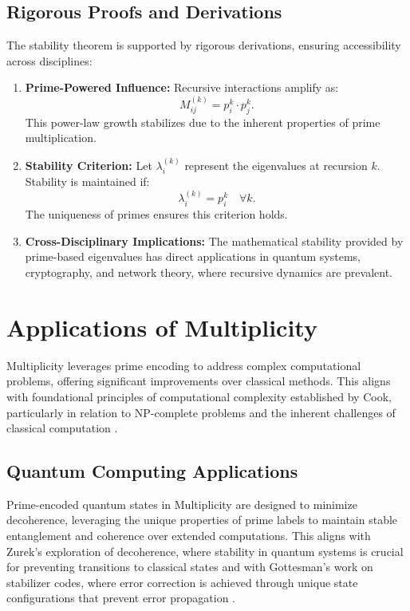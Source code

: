 \documentclass{article}
\theoremstyle{plain}
\begin{document}
\subsection{Rigorous Proofs and Derivations}
The stability theorem is supported by rigorous derivations, ensuring accessibility across disciplines:
\begin{enumerate}
    \item \textbf{Prime-Powered Influence:} Recursive interactions amplify as:
    \begin{equation}
    M_{ij}^{(k)} = p_i^{k} \cdot p_j^{k}.
    \end{equation}
    This power-law growth stabilizes due to the inherent properties of prime multiplication.
    
    \item \textbf{Stability Criterion:} Let $\lambda_i^{(k)}$ represent the eigenvalues at recursion $k$. Stability is maintained if:
    \begin{equation}
    \lambda_i^{(k)} = p_i^k \quad \forall k.
    \end{equation}
    The uniqueness of primes ensures this criterion holds.

    \item \textbf{Cross-Disciplinary Implications:} The mathematical stability provided by prime-based eigenvalues has direct applications in quantum systems, cryptography, and network theory, where recursive dynamics are prevalent.
\end{enumerate}
\section{Applications of Multiplicity}
Multiplicity leverages prime encoding to address complex computational problems, offering significant improvements over classical methods. This aligns with foundational principles of computational complexity established by Cook, particularly in relation to NP-complete problems and the inherent challenges of classical computation \cite{cook1971}.

\subsection{Quantum Computing Applications}

Prime-encoded quantum states in Multiplicity are designed to minimize decoherence, leveraging the unique properties of prime labels to maintain stable entanglement and coherence over extended computations. This aligns with Zurek’s exploration of decoherence, where stability in quantum systems is crucial for preventing transitions to classical states \cite{zurek1993} and with Gottesman’s work on stabilizer codes, where error correction is achieved through unique state configurations that prevent error propagation \cite{gottesman1997}.
\end{document}

